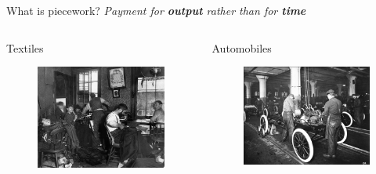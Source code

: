 \documentclass[presentation]{subfiles}
\begin{document}
\begin{frame}[t]{What is piecework?}
\centering
  \emph{Payment for \textbf{output} rather than for \textbf{time}}
\vspace*{2mm}
\begin{columns}
  \begin{column}{0.33\textwidth}
    \centering
    Textiles
    \begin{figure}
    \begin{overlayarea}{\textwidth}{33mm}
    \begin{minipage}[c][33mm]{\textwidth}
      \includegraphics[width=\textwidth]{figures/pieceworkers.jpg}
    \end{minipage}
    \end{overlayarea}
    \end{figure}
  \end{column}
  \begin{column}{0.33\textwidth}
    \centering
    Automobiles
    \begin{figure}
    \begin{overlayarea}{\textwidth}{33mm}
    \begin{minipage}[c][33mm]{\textwidth}
      \includegraphics[width=\textwidth]{figures/photo/ford_assembly_line.jpg}

\end{minipage}
\end{overlayarea}
\end{figure}
\end{column}
\end{columns}
\end{frame}
\end{document}
